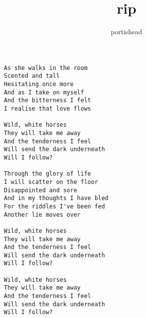 \author{portishead}
\title{rip}
\maketitle
\begin{verbatim}
As she walks in the room
Scented and tall
Hesitating once more
And as I take on myself
And the bitterness I felt
I realise that love flows

Wild, white horses
They will take me away
And the tenderness I feel
Will send the dark underneath
Will I follow?

Through the glory of life
I will scatter on the floor
Disappointed and sore
And in my thoughts I have bled
For the riddles I've been fed
Another lie moves over

Wild, white horses
They will take me away
And the tenderness I feel
Will send the dark underneath
Will I follow?

Wild, white horses
They will take me away
And the tenderness I feel
Will send the dark underneath
Will I follow?
\end{verbatim}